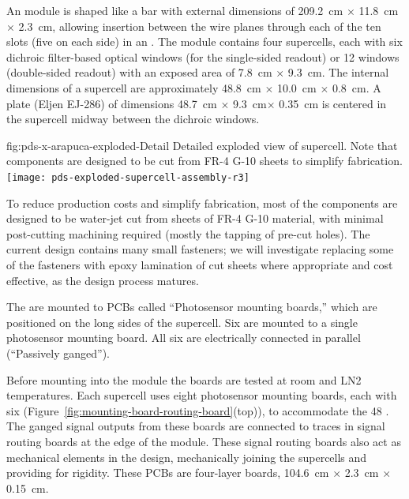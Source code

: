 An  module is shaped like a bar with external dimensions of \SI{209.2}{cm} $\times$ \SI{11.8}{cm} $\times$ \SI{2.3}{cm},  allowing insertion between the wire planes through each of the ten slots (five on each side) in an . 
The module contains four  supercells, each with six dichroic filter-based optical windows (for the single-sided readout) or 12 windows (double-sided readout) with an exposed area of \SI{7.8}{cm} $\times$ \SI{9.3}{cm}.  The internal dimensions of  a supercell are approximately \SI{48.8}{cm} $\times$ \SI{10.0}{cm} $\times$ \SI{0.8}{cm}. A  plate (Eljen EJ-286) of dimensions \SI{48.7}{cm} $\times$ \SI{9.3}{cm}$\times$ \SI{0.35}{cm} is centered in the supercell midway between the dichroic windows.  

\begin{dunefigure}{fig:pds-x-arapuca-exploded-Detail}
{Detailed exploded view of  supercell. Note that components are designed to be cut from FR-4 G-10 sheets to simplify fabrication.}
   \texttt{[image: pds-exploded-supercell-assembly-r3]}
\end{dunefigure}

To reduce production costs and simplify fabrication, most of the  components are designed to be water-jet cut from sheets of FR-4 G-10 material, with minimal post-cutting machining required (mostly the tapping of pre-cut holes).  The current design contains many small fasteners; we will investigate replacing some of the fasteners with epoxy lamination of cut sheets where appropriate and cost effective, as the design process matures.

The  are mounted to PCBs called ``Photosensor mounting boards,'' which are positioned on the long sides of the supercell.  
Six  are mounted to a single photosensor mounting board.  All six are electrically connected in parallel (``Passively ganged'').


 Before mounting into the  module the boards are tested at room and LN2 temperatures. 
 Each supercell uses eight photosensor mounting boards, each with six  (Figure~\ref{fig:mounting-board-routing-board}(top)), %
 to accommodate the 48 .  The ganged signal outputs from these boards are connected to traces in signal routing boards at the edge of the  module. These signal routing boards also act as mechanical elements in the design, mechanically joining the supercells and providing for rigidity.  These PCBs are four-layer boards, \SI{104.6}{cm} $\times$ \SI{2.3}{cm} $\times$ \SI{0.15}{cm}.

